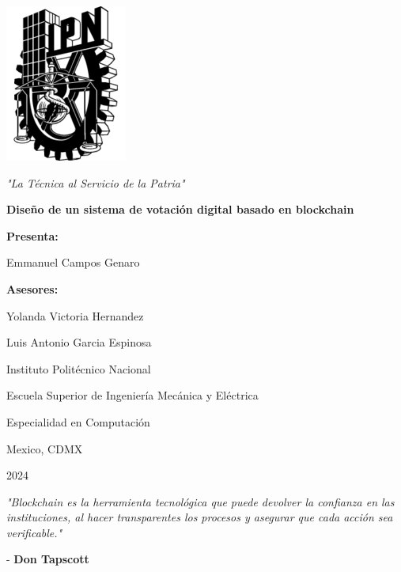 \documentclass{report}
\begin{document}
	
	\begin{titlepage}
		\centering
		\vspace*{1in}
		\includegraphics[width=0.3\textwidth]{ipn_logo.png}\par
		\vspace{1cm}
		\textit{"La Técnica al Servicio de la Patria"}\par
		\vspace{2cm}
		{\huge \textbf{Diseño de un sistema de votación digital basado en blockchain}\par}
		\vspace{2cm}
		\large
		\textbf{Presenta:}\par
		Emmanuel Campos Genaro\par
		\vspace{2cm}
		\textbf{Asesores:}\par
		Yolanda Victoria Hernandez\par
		Luis Antonio Garcia Espinosa\par
		\vfill
		\large
		Instituto Politécnico Nacional\par
		Escuela Superior de Ingeniería Mecánica y Eléctrica\par
		Especialidad en Computación\par
		\vspace{0.5cm}
		Mexico, CDMX\par
		2024
	\end{titlepage}
	
	\newpage
	\thispagestyle{empty}
	\vspace*{\fill}
	\begin{center}
		\begin{quoting}
			\textit{"Blockchain es la herramienta tecnológica que puede devolver la confianza en las instituciones, al hacer transparentes los procesos y asegurar que cada acción sea verificable."}
			
			\vspace{1cm}
			- \textbf{Don Tapscott}
		\end{quoting}
	\end{center}
	\vspace*{\fill}
	
\end{document}
